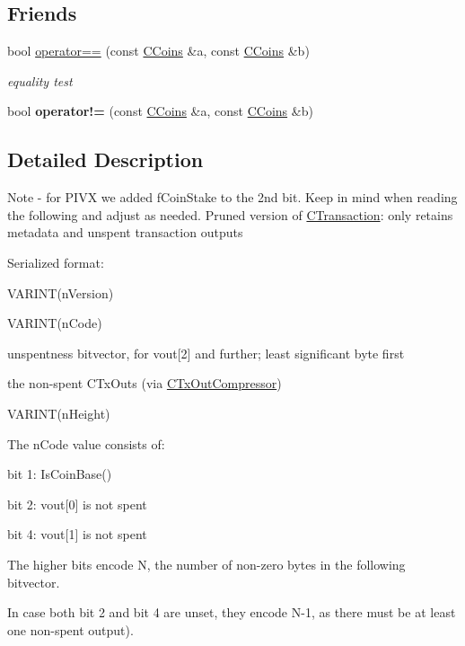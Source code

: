 \subsection*{Friends}
\begin{DoxyCompactItemize}
\item 
\mbox{\label{class_c_coins_a77593e3db3e4b369c21a91aad2afcc05}} 
bool \mbox{\hyperlink{class_c_coins_a77593e3db3e4b369c21a91aad2afcc05}{operator==}} (const \mbox{\hyperlink{class_c_coins}{C\+Coins}} \&a, const \mbox{\hyperlink{class_c_coins}{C\+Coins}} \&b)
\begin{DoxyCompactList}\small\item\em equality test \end{DoxyCompactList}\item 
\mbox{\label{class_c_coins_a42ef9fcc8ca59916b5fb69904db1c9bd}} 
bool {\bfseries operator!=} (const \mbox{\hyperlink{class_c_coins}{C\+Coins}} \&a, const \mbox{\hyperlink{class_c_coins}{C\+Coins}} \&b)
\end{DoxyCompactItemize}


\subsection{Detailed Description}
Note -\/ for P\+I\+VX we added f\+Coin\+Stake to the 2nd bit. Keep in mind when reading the following and adjust as needed. Pruned version of \mbox{\hyperlink{class_c_transaction}{C\+Transaction}}\+: only retains metadata and unspent transaction outputs

Serialized format\+:
\begin{DoxyItemize}
\item V\+A\+R\+I\+N\+T(n\+Version)
\item V\+A\+R\+I\+N\+T(n\+Code)
\item unspentness bitvector, for vout\mbox{[}2\mbox{]} and further; least significant byte first
\item the non-\/spent C\+Tx\+Outs (via \mbox{\hyperlink{class_c_tx_out_compressor}{C\+Tx\+Out\+Compressor}})
\item V\+A\+R\+I\+N\+T(n\+Height)
\end{DoxyItemize}

The n\+Code value consists of\+:
\begin{DoxyItemize}
\item bit 1\+: Is\+Coin\+Base()
\item bit 2\+: vout\mbox{[}0\mbox{]} is not spent
\item bit 4\+: vout\mbox{[}1\mbox{]} is not spent
\item The higher bits encode N, the number of non-\/zero bytes in the following bitvector.
\begin{DoxyItemize}
\item In case both bit 2 and bit 4 are unset, they encode N-\/1, as there must be at least one non-\/spent output).
\end{DoxyItemize}
\end{DoxyItemize}

